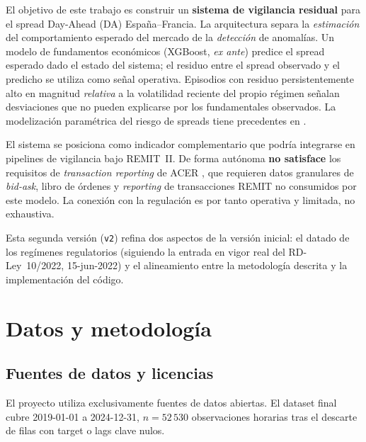 \documentclass[11pt,a4paper]{article}
\begin{document}
El objetivo de este trabajo es construir un \textbf{sistema de vigilancia
residual} para el spread Day-Ahead (DA) España--Francia. La arquitectura
separa la \emph{estimación} del comportamiento esperado del mercado de la
\emph{detección} de anomalías. Un modelo de fundamentos económicos (XGBoost,
\emph{ex ante}) predice el spread esperado dado el estado del sistema; el
residuo entre el spread observado y el predicho se utiliza como señal
operativa. Episodios con residuo persistentemente alto en magnitud
\emph{relativa} a la volatilidad reciente del propio régimen señalan
desviaciones que no pueden explicarse por los fundamentales observados.
La modelización paramétrica del riesgo de spreads tiene precedentes en
\citet{Bunn2016}.

El sistema se posiciona como indicador complementario que podría
integrarse en pipelines de vigilancia bajo REMIT~II. De forma autónoma
\textbf{no satisface} los requisitos de \emph{transaction reporting} de
ACER \citep{ACER2024}, que requieren datos granulares de \emph{bid-ask},
libro de órdenes y \emph{reporting} de transacciones REMIT no consumidos
por este modelo. La conexión con la regulación es por tanto operativa
y limitada, no exhaustiva.

Esta segunda versión (\texttt{v2}) refina dos aspectos de la versión
inicial: el datado de los regímenes regulatorios (siguiendo la entrada
en vigor real del RD-Ley~10/2022, 15-jun-2022) y el alineamiento entre
la metodología descrita y la implementación del código.

\section{Datos y metodología}

\subsection{Fuentes de datos y licencias}

El proyecto utiliza exclusivamente fuentes de datos abiertas. El dataset
final cubre 2019-01-01 a 2024-12-31, $n = 52\,530$ observaciones horarias
tras el descarte de filas con target o lags clave nulos.
\end{document}
